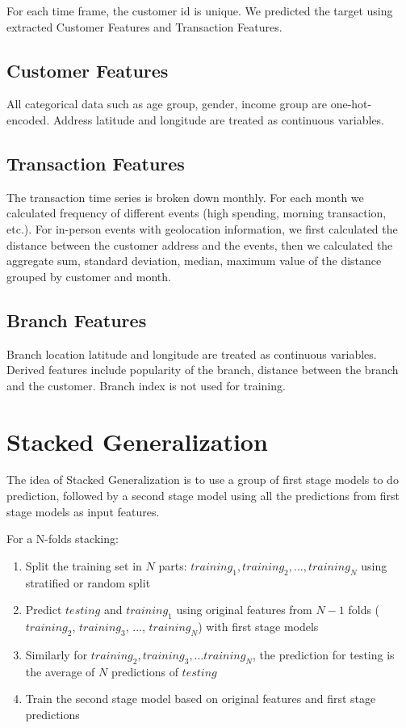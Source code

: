 \documentclass[a4paper]{llncs}
\begin{document}
For each time frame, the customer id is unique. We predicted the target using extracted Customer Features and Transaction Features.

\subsection{Customer Features}
All categorical data such as age group, gender, income group are one-hot-encoded. Address latitude and longitude are treated as continuous variables.

\subsection{Transaction Features}
The transaction time series is broken down monthly. For each month we calculated frequency of different events (high spending, morning transaction, etc.).
 For in-person events with geolocation information, we first calculated the distance between the customer address and the events,
 then we calculated the aggregate sum, standard deviation, median, maximum value of the distance grouped by customer and month.

\subsection{Branch Features}
Branch location latitude and longitude are treated as continuous variables. Derived features include popularity of the branch,
 distance between the branch and the customer. Branch index is not used for training.

\section{Stacked Generalization}
The idea of Stacked Generalization \cite{stacking} is to use a group of first stage models to do prediction,
 followed by a second stage model using all the predictions from first stage models as input features.


For a N-folds stacking:

\begin{enumerate}
 \item Split the training set in $N$ parts: $training_1, training_2, ..., training_N$ using stratified or random split

 \item Predict $testing$ and $training_1$ using original features from $N-1$ folds ($training_2$, $training_3$, $...$, $training_N$) with first stage models

 \item Similarly for $training_2, training_3, ... training_N$, the prediction for testing is the average of $N$ predictions of $testing$

 \item Train the second stage model based on original features and first stage predictions
\end{enumerate}
%
\end{document}
